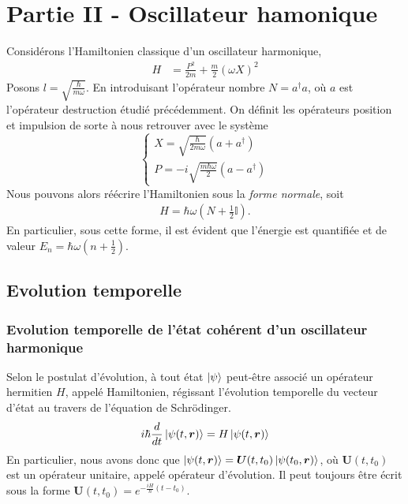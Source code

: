 \documentclass[11pt,oneside,a4paper]{article}
\newcommand{\h}{\ensuremath{\hbar}}
\begin{document}
\section{Partie II - Oscillateur hamonique}
\label{part 2}
Considérons l'Hamiltonien classique d'un oscillateur harmonique, 
\begin{align}
  \label{Hamiltonien OH}
  H &= \frac{P^2}{2m} + \frac{m}{2}\left(\omega X\right)^2
\end{align}
Posons $l = \sqrt{\frac{\h}{m\omega}}$. En introduisant l'opérateur nombre $N = a^\dagger a$, où $a$ est l'opérateur destruction étudié précédemment. On définit les opérateurs position et impulsion de sorte à nous retrouver avec le système
\begin{equation}
  \begin{cases}
    X = \sqrt{\frac{\h}{2m\omega}}\left(a+a^\dagger\right)\\
    P = -i\sqrt{\frac{m\h\omega}{2}}\left(a-a^\dagger\right)
  \end{cases}
  \label{P and X}
\end{equation}
Nous pouvons alors réécrire l'Hamiltonien sous la \emph{forme normale}, soit 
\begin{align}
  \label{Hamiltonien OH normale}
  H = \h\omega\left(N+\frac{1}{2}\mathbb{I}\right).
\end{align}
En particulier, sous cette forme, il est évident que l'énergie est quantifiée et de valeur $E_n = \h\omega\left(n+\frac{1}{2}\right)$.
\subsection{Evolution temporelle}
\subsubsection{Evolution temporelle de l'état cohérent d'un oscillateur harmonique}
Selon le postulat d'évolution, à tout état $\ket{\psi}$ peut-être associé un opérateur hermitien $H$, appelé Hamiltonien, régissant l'évolution temporelle du vecteur d'état au travers de l'équation de Schrödinger.
\begin{equation}
  i\h\frac{d}{dt}\ket{\psi(t,\bm{r})} = H\ket{\psi (t,\bm{r})}
\end{equation}
En particulier, nous avons donc que $\ket{\psi(t,\bm{r})} = \bm{U}(t,t_0)\ket{\psi(t_0,\bm{r})}$, où $\bm{U}(t,t_0)$ est un opérateur unitaire, appelé opérateur d'évolution. Il peut toujours être écrit sous la forme $\bm{U}(t,t_0) = e^{-\frac{iH}{\h}(t-t_0)}$.\\
\end{document}
